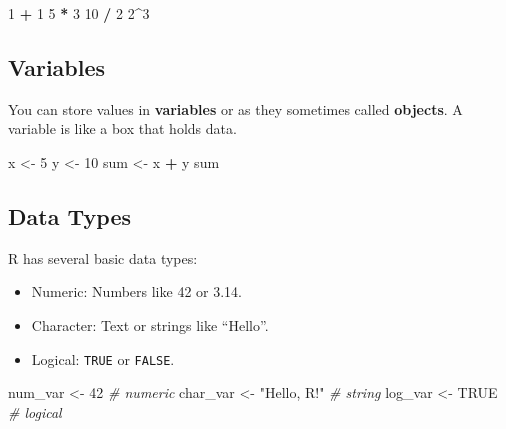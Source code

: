 \documentclass[
]{book}
\newenvironment{Shaded}{\begin{snugshade}}{\end{snugshade}}
\newcommand{\CommentTok}[1]{\textcolor[rgb]{0.56,0.35,0.01}{\textit{#1}}}
\newcommand{\ConstantTok}[1]{\textcolor[rgb]{0.56,0.35,0.01}{#1}}
\newcommand{\DecValTok}[1]{\textcolor[rgb]{0.00,0.00,0.81}{#1}}
\newcommand{\NormalTok}[1]{#1}
\newcommand{\OtherTok}[1]{\textcolor[rgb]{0.56,0.35,0.01}{#1}}
\newcommand{\SpecialCharTok}[1]{\textcolor[rgb]{0.81,0.36,0.00}{\textbf{#1}}}
\newcommand{\StringTok}[1]{\textcolor[rgb]{0.31,0.60,0.02}{#1}}
\providecommand{\tightlist}{%
  \setlength{\itemsep}{0pt}\setlength{\parskip}{0pt}}
\begin{document}
\begin{Shaded}
\begin{Highlighting}[]
\DecValTok{1} \SpecialCharTok{+} \DecValTok{1}
\DecValTok{5} \SpecialCharTok{*} \DecValTok{3}
\DecValTok{10} \SpecialCharTok{/} \DecValTok{2}
\DecValTok{2}\SpecialCharTok{\^{}}\DecValTok{3}
\end{Highlighting}
\end{Shaded}

\subsection{Variables}\label{variables}

You can store values in \textbf{variables} or as they sometimes called \textbf{objects}. A variable is like a box that holds data.

\begin{Shaded}
\begin{Highlighting}[]
\NormalTok{x }\OtherTok{\textless{}{-}} \DecValTok{5}
\NormalTok{y }\OtherTok{\textless{}{-}} \DecValTok{10}
\NormalTok{sum }\OtherTok{\textless{}{-}}\NormalTok{ x }\SpecialCharTok{+}\NormalTok{ y}
\NormalTok{sum}
\end{Highlighting}
\end{Shaded}

\subsection{Data Types}\label{data-types}

R has several basic data types:

\begin{itemize}
\tightlist
\item
  Numeric: Numbers like 42 or 3.14.
\item
  Character: Text or strings like ``Hello''.
\item
  Logical: \texttt{TRUE} or \texttt{FALSE}.
\end{itemize}

\begin{Shaded}
\begin{Highlighting}[]
\NormalTok{num\_var }\OtherTok{\textless{}{-}} \DecValTok{42}  \CommentTok{\# numeric}
\NormalTok{char\_var }\OtherTok{\textless{}{-}} \StringTok{"Hello, R!"}  \CommentTok{\# string}
\NormalTok{log\_var }\OtherTok{\textless{}{-}} \ConstantTok{TRUE} \CommentTok{\# logical }
\end{Highlighting}
\end{Shaded}
\end{document}
